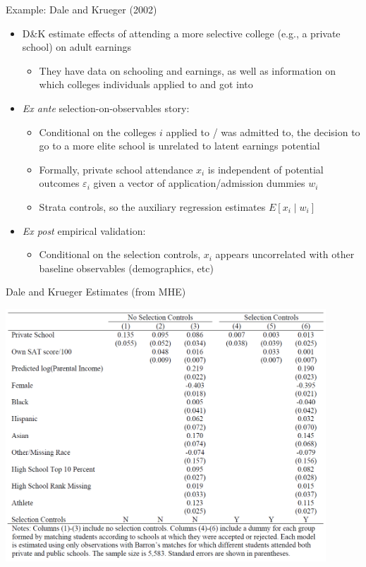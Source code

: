 \documentclass[11pt,english]{beamer}
\begin{document}
\begin{frame}{Example: Dale and Krueger (2002)}
\begin{itemize}
\item D\&K estimate effects of attending a more selective college (e.g., a private school) on adult earnings\smallskip
\begin{itemize}
\item They have data on schooling and earnings, as well as information on which colleges individuals applied to and got into
\end{itemize}\bigskip\pause{}

\item \emph{Ex ante} selection-on-observables story: \smallskip
\begin{itemize}
\item Conditional on the colleges $i$ applied to / was admitted to, the decision to go to a more elite school is unrelated to latent earnings potential \smallskip\pause{}
\item Formally, private school attendance $x_i$ is independent of potential outcomes $\varepsilon_i$ given a vector of application/admission dummies $w_i$\smallskip\pause{}
\item Strata controls, so the auxiliary regression estimates $E[x_i\mid w_i]$
\end{itemize}\bigskip\pause{}

\item \emph{Ex post} empirical validation:\smallskip
\begin{itemize}
\item Conditional on the selection controls, $x_i$ appears uncorrelated with other baseline observables (demographics, etc)
\end{itemize}
\end{itemize}

\end{frame}

\begin{frame}{Dale and Krueger Estimates (from MHE)}
\vspace{-0.1cm}
\begin{center}
	\includegraphics[width=0.9\textwidth]{figures/DK02.png}
\end{center}

\end{frame}
\end{document}
